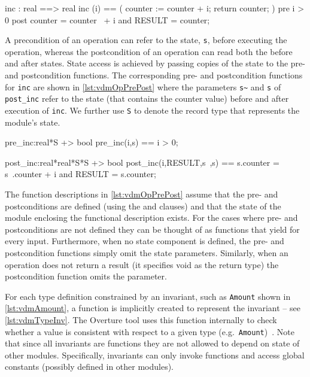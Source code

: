 \begin{vdmsl}[style=customVdm,caption={\ac{vdmsl} operation for
incrementing a counter.},label={lst:vdmInc}]
inc : real ==> real
inc (i) == (
 counter := counter + i;
 return counter;
)
pre i > 0
post counter = counter~ + i and
     RESULT = counter;
\end{vdmsl}

A precondition of an operation can refer to the state, \texttt{s},
before executing the operation, whereas the postcondition of an
operation can read both the before and after states. State access is
achieved by passing copies of the state to the pre- and postcondition
functions. The corresponding pre- and postcondition functions for
\texttt{inc} are shown in \autoref{lst:vdmOpPrePost} where the
parameters \texttt{s\~} and \texttt{s} of \texttt{post\_inc} refer to
the state (that contains the counter value) before and after execution
of \texttt{inc}. We further use \texttt{S} to denote the record type
that represents the module's state.

\begin{vdmsl}[style=customVdm,caption={Pre- and postcondition
functions for the \texttt{inc} operation shown in
\autoref{lst:vdmInc}.},label={lst:vdmOpPrePost}]
pre_inc:real*S +> bool
pre_inc(i,s) == i > 0;

post_inc:real*real*S*S +> bool
post_inc(i,RESULT,s~,s) ==
s.counter = s~.counter + i and
RESULT = s.counter;
\end{vdmsl}

The function descriptions in \autoref{lst:vdmOpPrePost} assume that
the pre- and postconditions are defined (using the  and
 clauses) and that the state of the module enclosing the
functional description exists. For the cases where pre- and
postconditions are not defined they can be thought of as functions
that yield  for every input. Furthermore, when no state
component is defined, the pre- and postcondition functions simply omit
the state parameters. Similarly, when an operation does not return a
result (it specifies void as the return type) the postcondition
function omits the  parameter.

For each type definition constrained by an invariant, such as
\texttt{Amount} shown in \autoref{lst:vdmAmount}, a function is
implicitly created to represent the invariant -- see
\autoref{lst:vdmTypeInv}. The Overture tool uses this function
internally to check whether a value is consistent with respect to a
given type (e.g.\ \texttt{Amount})~\cite{Lausdahl&11}. Note that since
all invariants are functions they are not allowed to depend on state
of other modules. Specifically, invariants can only invoke functions
and access global constants (possibly defined in other modules).

